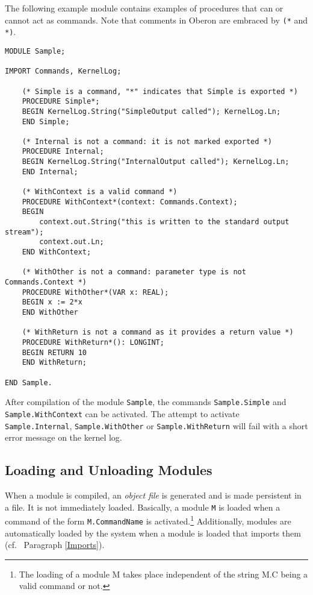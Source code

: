 \documentclass[a4paper,11pt]{article}
\begin{document}
The following example module contains examples of procedures that can or cannot act as commands. Note that comments in Oberon are embraced by \verb+(*+ and \verb+*)+.
\begin{lstlisting}[language=Oberon,frame=none,caption=Procedures and Commands]
MODULE Sample;

IMPORT Commands, KernelLog;

    (* Simple is a command, "*" indicates that Simple is exported *)
    PROCEDURE Simple*;
    BEGIN KernelLog.String("SimpleOutput called"); KernelLog.Ln;
    END Simple;

    (* Internal is not a command: it is not marked exported *)
    PROCEDURE Internal;
    BEGIN KernelLog.String("InternalOutput called"); KernelLog.Ln;
    END Internal;

    (* WithContext is a valid command *)
    PROCEDURE WithContext*(context: Commands.Context);
    BEGIN
        context.out.String("this is written to the standard output stream");
        context.out.Ln;
    END WithContext;

    (* WithOther is not a command: parameter type is not Commands.Context *)
    PROCEDURE WithOther*(VAR x: REAL);
    BEGIN x := 2*x
    END WithOther

    (* WithReturn is not a command as it provides a return value *)
    PROCEDURE WithReturn*(): LONGINT;
    BEGIN RETURN 10
    END WithReturn;

END Sample.
\end{lstlisting}

After compilation of the module \verb+Sample+, the commands \verb+Sample.Simple+ and \verb+Sample.WithContext+ can be activated. The attempt to activate \verb+Sample.Internal+, \verb+Sample.WithOther+ or \verb+Sample.WithReturn+ will fail with a short error message on the kernel log.

\subsection{Loading and Unloading Modules}
When a module is compiled, an {\em object file} is generated and is made persistent in a file. It is not immediately loaded.
Basically, a module \verb+M+ is loaded when a command of the form \verb+M.CommandName+ is activated.\footnote{The loading of a module M takes place independent of the string M.C being a valid command or not.} Additionally, modules are automatically loaded by the system when a module is loaded that imports them (cf.~ Paragraph \ref{Imports}).
\end{document}
